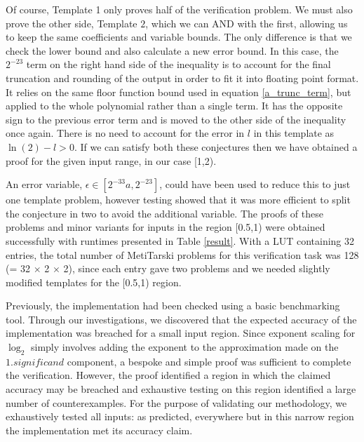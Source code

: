 \documentclass{fac}
\begin{document}
Of course, Template 1 only proves half of the verification problem. We must also prove the other side, Template $2$, which we can AND with the first, allowing us to keep the same coefficients and variable bounds. The only difference is that we check the lower bound and also calculate a new error bound. In this case, the $2^{-23}$ term on the right hand side of the inequality is to account for the final truncation and rounding of the output in order to fit it into floating point format. It relies on the same floor function bound used in equation \ref{a_trunc_term}, but applied to the whole polynomial rather than a single term. It has the opposite sign to the previous error term and is moved to the other side of the inequality once again. There is no need to account for the error in $l$ in this template as $\ln{(2)}-l>0$. If we can satisfy both these conjectures then we have obtained a proof for the given input range, in our case [1,2). 

An error variable, $\epsilon \in [2^{-33}a, 2^{-23}]$, could have been used to reduce this to just one template problem, however testing showed that it was more efficient to split the conjecture in two to avoid the additional variable. The proofs of these problems and minor variants for inputs in the region [0.5,1) were obtained successfully with runtimes presented in Table \ref{result}. With a LUT containing 32 entries, the total number of MetiTarski problems for this verification task was 128 (= 32 $\times$ 2 $\times$ 2), since each entry gave two problems and we needed slightly modified templates for the [0.5,1) region. 

Previously, the implementation had been checked using a basic benchmarking tool. Through our investigations, we discovered that the expected accuracy of the implementation was breached for a small input region. Since exponent scaling for $\log_2$ simply involves adding the exponent to the approximation made on the $1.\textit{significand}$ component, a bespoke and simple proof was sufficient to complete the verification. However, the proof identified a region in which the claimed accuracy may be breached and exhaustive testing on this region identified a large number of counterexamples. For the purpose of validating our methodology, we exhaustively tested all inputs: as predicted, everywhere but in this narrow region the implementation met its accuracy claim.
\end{document}
